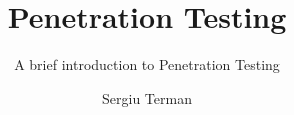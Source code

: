 \documentclass{beamer}
\title[Penetration Testing] %
{Penetration Testing}
\subtitle{A brief introduction to Penetration Testing}
\author[Author, Anders] %
{Sergiu Terman}
\institute[FIT CVUT] %
{CVUT}
\begin{document}
\frame{\titlepage}
\end{document}
